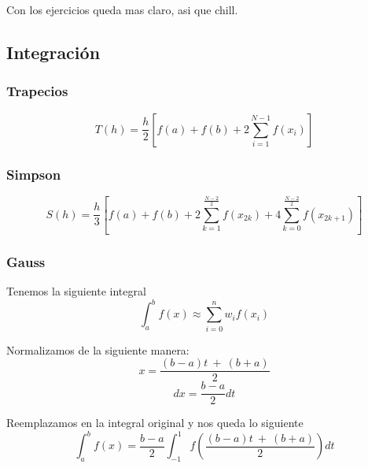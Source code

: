 Con los ejercicios queda mas claro, asi que chill. 


\subsection{Integración}
    \subsubsection{Trapecios}
    $$T(h) = \frac{h}{2} [f(a) + f(b) + 2\sum_{i = 1}^{N-1}f(x_{i})]$$
    
    \subsubsection{Simpson}
    $$
    S(h) = \frac{h}{3} [f(a) + f(b) + 2\sum_{k = 1}^{\frac{N-2}{2}}f(x_{2k}) + 4\sum_{k = 0}^{\frac{N-2}{2}}f(x_{2k + 1})]
    $$
    \subsubsection{Gauss}

    Tenemos la siguiente integral
    $$\int_{a}^{b} f(x) \approx \sum_{i = 0}^{n} w_if(x_i)$$

    Normalizamos de la siguiente manera: 
    $$x = \frac{(b-a)t ~+~ (b+a) }{2}$$
    $$dx = \frac{b-a}{2} dt$$

    Reemplazamos en la integral original y nos queda lo siguiente
    $$\int_{a}^{b} f(x) = \frac{b-a}{2}\int_{-1}^{1}f(\frac{(b-a)t ~+~ (b+a) }{2})dt$$